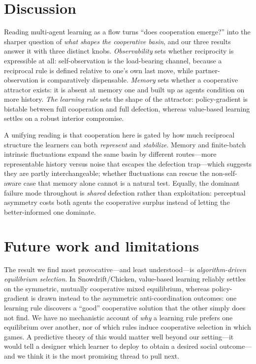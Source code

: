 \documentclass{article}
\begin{document}
\section{Discussion}

Reading multi-agent learning as a flow turns ``does cooperation emerge?'' into the sharper question of \emph{what shapes the cooperative basin}, and our three results answer it with three distinct knobs. \emph{Observability} sets whether reciprocity is expressible at all: self-observation is the load-bearing channel, because a reciprocal rule is defined relative to one's own last move, while partner-observation is comparatively dispensable. \emph{Memory} sets whether a cooperative attractor exists: it is absent at memory one and built up as agents condition on more history. \emph{The learning rule} sets the shape of the attractor: policy-gradient is bistable between full cooperation and full defection, whereas value-based learning settles on a robust interior compromise.

A unifying reading is that cooperation here is gated by how much reciprocal structure the learners can both \emph{represent} and \emph{stabilize}. Memory and finite-batch intrinsic fluctuations \cite{8} expand the same basin by different routes---more representable history versus noise that escapes the defection trap---which suggests they are partly interchangeable; whether fluctuations can rescue the non-self-aware case that memory alone cannot is a natural test. Equally, the dominant failure mode throughout is \emph{shared} defection rather than exploitation: perceptual asymmetry costs both agents the cooperative surplus instead of letting the better-informed one dominate.

\section{Future work and limitations}
\label{sec:future}

The result we find most provocative---and least understood---is \emph{algorithm-driven equilibrium selection}. In Snowdrift/Chicken, value-based learning reliably settles on the symmetric, mutually cooperative mixed equilibrium, whereas policy-gradient is drawn instead to the asymmetric anti-coordination outcomes: one learning rule discovers a ``good'' cooperative solution that the other simply does not find. We have no mechanistic account of \emph{why} a learning rule prefers one equilibrium over another, nor of which rules induce cooperative selection in which games. A predictive theory of this would matter well beyond our setting---it would tell a designer which learner to deploy to obtain a desired social outcome---and we think it is the most promising thread to pull next.
\end{document}
